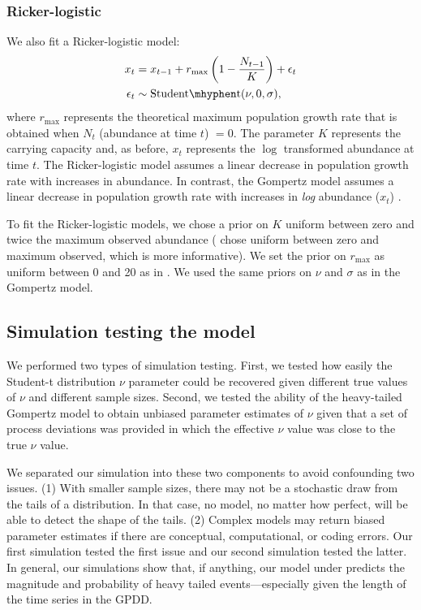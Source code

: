 \subsubsection{Ricker-logistic}

We also fit a Ricker-logistic model:
\begin{align*}
x_t &= x_{t-1} + r_{\mathrm{max}}\left(1 - \frac{N_{t-1}}{K}\right) + \epsilon_t\\
\epsilon_t &\sim \mathrm{Student\mhyphen t}(\nu, 0, \sigma),
\end{align*}
where $r_\mathrm{max}$ represents the theoretical maximum population growth
rate that is obtained when $N_t$ (abundance at time $t$) $= 0$. The parameter
$K$ represents the carrying capacity and, as before, $x_t$ represents the
$\log$ transformed abundance at time $t$. The Ricker-logistic model assumes a
linear decrease in population growth rate with increases in abundance. In
contrast, the Gompertz model assumes a linear decrease in population growth
rate with increases in \textit{log} abundance ($x_t$)
\citep[e.g.][]{thibaut2012}.

To fit the Ricker-logistic models, we chose a prior on $K$ uniform between
zero and twice the maximum observed abundance (\citet{clark2010} chose uniform
between zero and maximum observed, which is more informative). We set the
prior on $r_\mathrm{max}$ as uniform between 0 and 20 as in \citet{clark2010}.
We used the same priors on $\nu$ and $\sigma$ as in the Gompertz model.

\subsection{Simulation testing the model}

We performed two types of simulation testing. First, we tested how easily the
Student-t distribution $\nu$ parameter could be recovered given different true
values of $\nu$ and different sample sizes. Second, we tested the ability of
the heavy-tailed Gompertz model to obtain unbiased parameter estimates of
$\nu$ given that a set of process deviations was provided in which the
effective $\nu$ value was close to the true $\nu$ value.

We separated our simulation into these two components to avoid confounding two
issues. (1) With smaller sample sizes, there may not be a stochastic draw from
the tails of a distribution. In that case, no model, no matter how perfect,
will be able to detect the shape of the tails. (2) Complex models may return
biased parameter estimates if there are conceptual, computational, or coding
errors. Our first simulation tested the first issue and our second simulation
tested the latter. In general, our simulations show that, if anything, our
model under predicts the magnitude and probability of heavy tailed
events---especially given the length of the time series in the GPDD.

